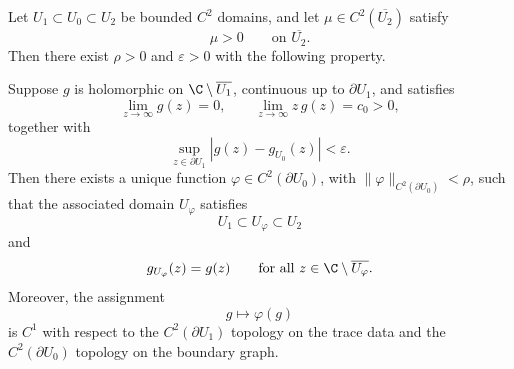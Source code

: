 \begin{proposition}\label{prop:cherednichenko-tailored}
Let \(U_1\subset U_0\subset U_2\) be bounded \(C^2\) domains, and let
\(\mu\in C^2(\overline{U_2})\) satisfy
\[
\mu>0 \qquad \text{on }\overline{U_2}.
\]
Then there exist \(\rho>0\) and \(\varepsilon>0\) with the following property.

Suppose \(g\) is holomorphic on \(\C\setminus \overline{U_1}\), continuous up
to \(\partial U_1\), and satisfies
\begin{equation}\label{eq:appendix-g-hypotheses}
\lim_{z\to\infty} g(z)=0,
\qquad
\lim_{z\to\infty} z\,g(z)=c_0>0,
\end{equation}
together with
\[
\sup_{z\in \partial U_1}|g(z)-g_{U_0}(z)|<\varepsilon.
\]
Then there exists a unique function
\(\varphi\in C^2(\partial U_0)\), with \(\|\varphi\|_{C^2(\partial U_0)}<\rho\),
such that the associated domain \(U_\varphi\) satisfies
\[
U_1\subset U_\varphi\subset U_2
\]
and
\[
g_{U_\varphi}(z)=g(z)
\qquad \text{for all } z\in \C\setminus \overline{U_\varphi}.
\]
Moreover, the assignment
\[
g\mapsto \varphi(g)
\]
is \(C^1\) with respect to the \(C^2(\partial U_1)\) topology on the trace
data and the \(C^2(\partial U_0)\) topology on the boundary graph.
\end{proposition}


